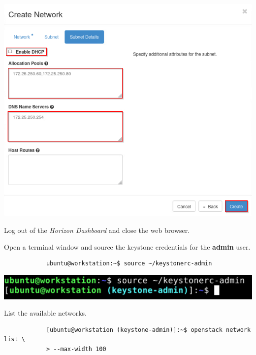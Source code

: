 \documentclass[letterpaper, 12pt]{article}
\begin{document}
\begin{enumerate}
\begin{labstep}
        \begin{center}
            \includegraphics[width=\linewidth]{images/part1/step9.png}
        \end{center}
    \end{labstep}

    \begin{labstep}
        Log out of the \textit{Horizon Dashboard} and close the web browser.
    \end{labstep}

    \begin{labstep}
        Open a terminal window and source the keystone credentials for the \textbf{admin} user.
        \begin{lstlisting}
            ubuntu@workstation:~$ source ~/keystonerc-admin
        \end{lstlisting}

        \begin{center}
            \includegraphics[width=\linewidth]{images/part1/step11.png}
        \end{center}
    \end{labstep}

    \begin{labstep}
        List the available networks.
        \begin{lstlisting}
            [ubuntu@workstation (keystone-admin)]:~$ openstack network list \
            > --max-width 100
        \end{lstlisting}


\end{labstep}
\end{enumerate}
\end{document}
